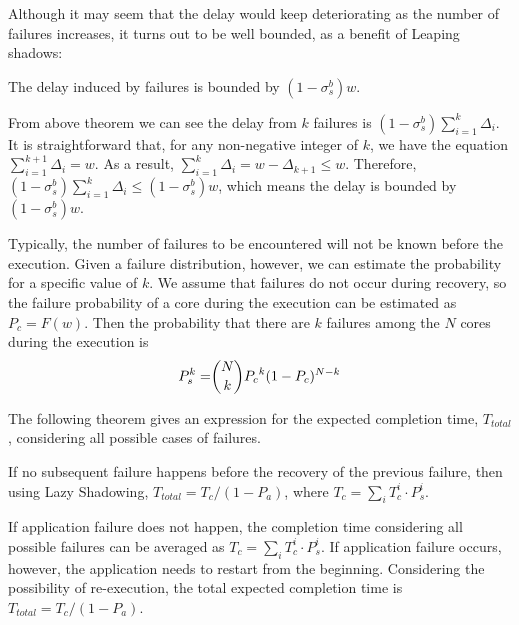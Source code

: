 Although it may seem that the delay would keep deteriorating as the number of failures increases, 
it turns out to be well bounded, as a benefit of Leaping shadows:

\begin{corollary}
The delay induced by failures is bounded by $(1-\sigma_s^b)w$.
\end{corollary}
\begin{IEEEproof}
From above theorem we can see the delay from $k$ failures is $(1-\sigma_s^b)\sum_{i=1}^k\Delta_i$. It is straightforward that, for any non-negative integer of $k$, we have the equation $\sum_{i=1}^{k+1}\Delta_i= w$. As a result, 
$\sum_{i=1}^{k}\Delta_i = w - \Delta_{k+1} \le w$. Therefore, $(1-\sigma_s^b)\sum_{i=1}^k\Delta_i \le (1-\sigma_s^b)w$, which means the delay is bounded by $(1-\sigma_s^b)w$.
\end{IEEEproof}

Typically, the number of failures to be encountered will not be known before the execution. Given a failure distribution, however, we can estimate the probability for a specific value of $k$. We assume that failures do not occur during recovery, so the failure probability of a core during the execution can be estimated as $P_c = F(w)$. Then the probability that there are $k$ failures among the $N$ cores during the execution is 
\begin{equation}
\begin{split}
P_s^{k}= & \dbinom{N}{k}{P_c}^k(1-P_c)^{N-k} \\
\end{split}
\end{equation}

The following theorem gives an expression for the expected completion time, $T_{total}$, considering all possible cases of failures. 

\begin{theorem}
If no subsequent failure happens before the recovery of the previous failure, then using Lazy Shadowing,
$T_{total} = T_{c} / (1 - P_a)$, where $T_{c} = \sum_{i} T_{c}^{i} \cdot P_s^{i}$.
\end{theorem}
\begin{IEEEproof}
If application failure does not happen, the completion time considering all possible failures can be averaged as $T_{c} = \sum_{i} T_{c}^{i} \cdot P_s^{i}$. If application failure occurs, however, the application needs to restart from the beginning. Considering the possibility of re-execution, the total expected completion time is $T_{total} = T_{c} / (1 - P_a)$.
\end{IEEEproof}

